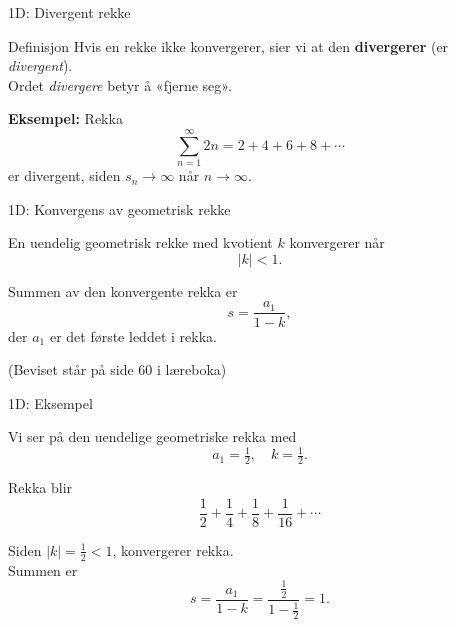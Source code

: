 \blueheader
\begin{frame}{1D: Divergent rekke}

\begin{blue*}{Definisjon}
Hvis en rekke ikke konvergerer, sier vi at den \textbf{divergerer} (er \emph{divergent}). \\


Ordet \emph{divergere} betyr å «fjerne seg».  

\medskip
\textbf{Eksempel:} Rekka
\[
\sum_{n=1}^{\infty} 2n = 2 + 4 + 6 + 8 + \cdots
\]
er divergent, siden $s_n \to \infty$ når $n \to \infty$.
\end{blue*}
\end{frame}

\redheader
\begin{frame}{1D: Konvergens av geometrisk rekke}


En uendelig geometrisk rekke med kvotient $k$ konvergerer når
\[
|k| < 1.
\]

Summen av den konvergente rekka er
\[
s = \frac{a_1}{1-k},
\]
der $a_1$ er det første leddet i rekka.

\vspace{1cm}
(Beviset står på side 60 i læreboka)

\end{frame}
\greenheader
\begin{frame}{1D: Eksempel}


Vi ser på den uendelige geometriske rekka med
\[
a_1 = \tfrac{1}{2}, \quad k = \tfrac{1}{2}.
\]

\medskip
Rekka blir
\[
\frac{1}{2} + \frac{1}{4} + \frac{1}{8} + \frac{1}{16} + \cdots
\]

Siden $|k| = \tfrac12 < 1$, konvergerer rekka. \\

Summen er
\[
s = \frac{a_1}{1-k} = \frac{\tfrac12}{1-\tfrac12} = 1.
\]

\end{frame}


